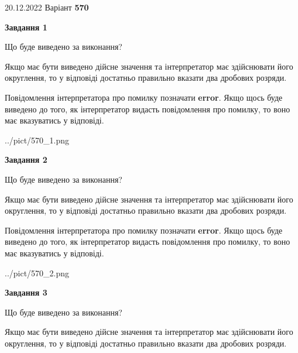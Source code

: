 \documentclass[12pt, ukrainian]{article}
\begin{document}
{20.12.2022 Варіант \No \textbf { 570 }\par}
{
\begin {Large}

{\begin {center}\textbf{Завдання 1}\end {center}}\par
Що буде виведено за виконання? \par

Якщо має бути виведено дійсне значення та інтерпретатор має здійснювати його округлення, 
то у відповіді достатньо правильно вказати два дробових розряди.

Повідомлення інтерпретатора про помилку позначати \textbf{error}.
Якщо щось буде виведено до того, як інтерпретатор видасть повідомлення про помилку, 
то воно має вказуватись у відповіді. \par

\begin{center}
	{../pict/570_1.png}
\end{center}
\newpage

{\begin {center}\textbf{Завдання 2}\end {center}}\par
Що буде виведено за виконання? \par

Якщо має бути виведено дійсне значення та інтерпретатор має здійснювати його округлення, 
то у відповіді достатньо правильно вказати два дробових розряди.

Повідомлення інтерпретатора про помилку позначати \textbf{error}.
Якщо щось буде виведено до того, як інтерпретатор видасть повідомлення про помилку, 
то воно має вказуватись у відповіді. \par

\begin{center}
	{../pict/570_2.png}
\end{center}
\newpage

{\begin {center}\textbf{Завдання 3}\end {center}}\par
Що буде виведено за виконання? \par

Якщо має бути виведено дійсне значення та інтерпретатор має здійснювати його округлення, 
то у відповіді достатньо правильно вказати два дробових розряди.


\end{Large}}
\end{document}
